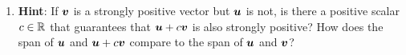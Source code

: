 \begin{enumerate}[!HW!, start=1]

\item \textbf{Hint}: If $\boldsymbol v$ is a strongly positive vector but $\boldsymbol u$ is not, is there a positive scalar $c\in \mathbb{R}$ that guarantees that $\boldsymbol u + c\boldsymbol v$ is also strongly positive? How does the span  of $\boldsymbol u$ and $\boldsymbol u+c\boldsymbol v$ compare to the span of $\boldsymbol u$ and $\boldsymbol v$?
\end{enumerate}

\vspace{-15 pt}